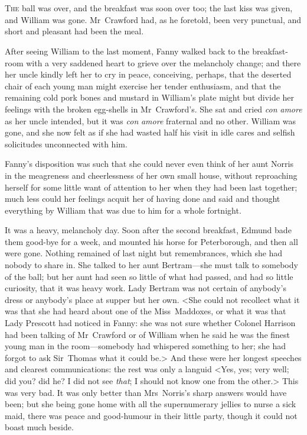 \chapter[Chapter \thechapter]{} 

 \lettrine[lraise=0.3]{T}{he} ball was over, and the breakfast was soon over too; the last kiss was given, and William was gone. Mr~Crawford had, as he foretold, been very punctual, and short and pleasant had been the meal.

After seeing William to the last moment, Fanny walked back to the breakfast-room with a very saddened heart to grieve over the melancholy change; and there her uncle kindly left her to cry in peace, conceiving, perhaps, that the deserted chair of each young man might exercise her tender enthusiasm, and that the remaining cold pork bones and mustard in William's plate might but divide her feelings with the broken egg-shells in Mr~Crawford's. She sat and cried \textit{con}  \textit{amore}  as her uncle intended, but it was \textit{con}  \textit{amore}  fraternal and no other. William was gone, and she now felt as if she had wasted half his visit in idle cares and selfish solicitudes unconnected with him.

Fanny's disposition was such that she could never even think of her aunt Norris in the meagreness and cheerlessness of her own small house, without reproaching herself for some little want of attention to her when they had been last together; much less could her feelings acquit her of having done and said and thought everything by William that was due to him for a whole fortnight.

It was a heavy, melancholy day. Soon after the second breakfast, Edmund bade them good-bye for a week, and mounted his horse for Peterborough, and then all were gone. Nothing remained of last night but remembrances, which she had nobody to share in. She talked to her aunt Bertram—she must talk to somebody of the ball; but her aunt had seen so little of what had passed, and had so little curiosity, that it was heavy work. Lady Bertram was not certain of anybody's dress or anybody's place at supper but her own. <She could not recollect what it was that she had heard about one of the Miss~Maddoxes, or what it was that Lady Prescott had noticed in Fanny: she was not sure whether Colonel Harrison had been talking of Mr~Crawford or of William when he said he was the finest young man in the room—somebody had whispered something to her; she had forgot to ask Sir~Thomas what it could be.> And these were her longest speeches and clearest communications: the rest was only a languid <Yes, yes; very well; did you? did he? I did not see \textit{that}; I should not know one from the other.> This was very bad. It was only better than Mrs~Norris's sharp answers would have been; but she being gone home with all the supernumerary jellies to nurse a sick maid, there was peace and good-humour in their little party, though it could not boast much beside.

